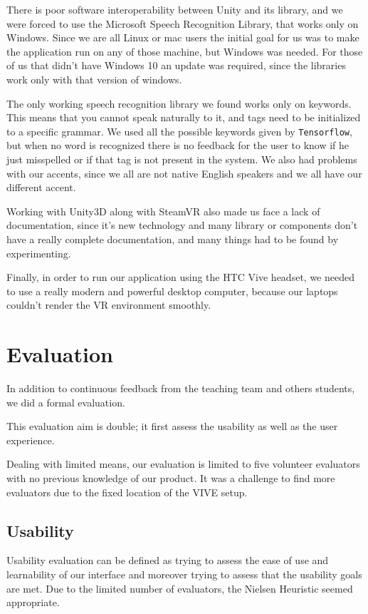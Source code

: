 \documentclass[11pt,a4paper]{article}
\begin{document}
There is poor software interoperability between Unity and its library, and we were forced to use the Microsoft Speech Recognition Library, that works only on Windows. 
Since we are all Linux or mac users the initial goal for us was to make the application run on any of those machine, but Windows was needed.
For those of us that didn't have Windows 10 an update was required, since the libraries work only with that version of windows.

The only working speech recognition library we found works only on keywords. This means that you cannot speak naturally to it, and tags need to be initialized to a specific grammar. We used all the possible keywords given by \texttt{Tensorflow}, but when no word is recognized there is no feedback for the user to know if he just misspelled or if that tag is not present in the system.
We also had problems with our accents, since we all are not native English speakers and we all have our different accent.

Working with Unity3D along with SteamVR also made us face a lack of documentation, since it's new technology and many library or components don't have a really complete documentation, and many things had to be found by experimenting.

Finally, in order to run our application using the HTC Vive headset, we needed to use a really modern and powerful desktop computer, because our laptops couldn't render the VR environment smoothly.

\section{Evaluation} \label{eval}

In addition to continuous feedback from the teaching team and others students, we did a formal evaluation.

This evaluation aim is double; it first assess the usability as well as the user experience.

Dealing with limited means, our evaluation is limited to five volunteer evaluators with no previous knowledge of our product. It was a challenge to find more evaluators due to the fixed location of the VIVE setup.

\subsection{Usability}

Usability evaluation can be defined as trying to assess the ease of use and learnability of our interface and moreover trying to assess that the usability goals are met. Due to the limited number of evaluators, the Nielsen Heuristic seemed appropriate.
\end{document}
